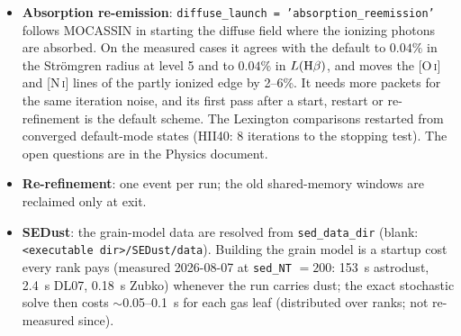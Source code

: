 \documentclass[english,a4paper]{my_memo}
\newcommand{\code}[1]{\texttt{#1}}
\begin{document}
\begin{itemize}
  DL07: $6.2054\times10^{-5}$--$3.981\times10^4\,\mu$m).  If
  \code{ion\_dust\_kext} names an explicit table, that table must cover the
  transported band; tables are sorted on read (the D03 file has an
  out-of-order seam).
\item \textbf{Absorption re-emission}: \code{diffuse\_launch =
  'absorption\_reemission'} follows MOCASSIN in starting the diffuse field
  where the ionizing photons are absorbed.  On the measured cases it agrees
  with the default to $0.04\%$ in the Str\"omgren radius at level 5 and to
  $0.04\%$ in $L({\rm H}\beta)$, and moves the [O\,\textsc{i}] and
  [N\,\textsc{i}] lines of the partly ionized edge by 2--6\%.  It needs
  more packets for the same iteration noise, and its first pass after a
  start, restart or re-refinement is the default scheme.  The Lexington
  comparisons restarted from converged default-mode states (HII40: 8
  iterations to the stopping test).  The open questions are
  in the Physics document.
\item \textbf{Re-refinement}: one event per run; the old shared-memory
  windows are reclaimed only at exit.
\item \textbf{SEDust}: the grain-model data are resolved from
  \code{sed\_data\_dir} (blank: \code{<executable dir>/SEDust/data}).
  Building the grain model is a startup cost every rank pays (measured
  2026-08-07 at \code{sed\_NT} $=200$: 153~s astrodust, 2.4~s DL07, 0.18~s
  Zubko) whenever the run carries dust; the exact stochastic solve then costs
  $\sim$0.05--0.1~s for each gas leaf (distributed over ranks; not
  re-measured since).
\end{itemize}
\end{document}
